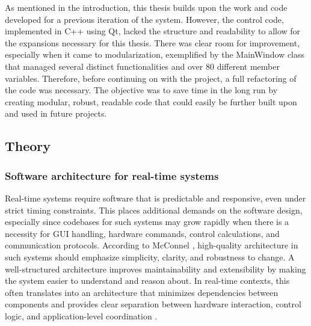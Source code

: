 As mentioned in the introduction, this thesis builds upon the work and code developed for a previous iteration of the system. However, the control code, implemented in C++ using Qt, lacked the structure and readability to allow for the expansions necessary for this thesis. There was clear room for improvement, especially when it came to modularization, exemplified by the MainWindow class that managed several distinct functionalities and over 80 different member variables. Therefore, before continuing on with the project, a full refactoring of the code was necessary. The objective was to save time in the long run by creating modular, robust, readable code that could easily be further built upon and used in future projects.

\subsection{Theory}
\subsubsection{Software architecture for real-time systems}
Real-time systems require software that is predictable and responsive, even under strict timing constraints. This places additional demands on the software design, especially since codebases for such systems may grow rapidly when there is a necessity for GUI handling, hardware commands, control calculations, and communication protocols. According to McConnel \cite{steve_mcconnell_code_nodate}, high-quality architecture in such systems should emphasize simplicity, clarity, and robustness to change. 
\newline \newline
A well-structured architecture improves maintainability and extensibility by making the system easier to understand and reason about. In real-time contexts, this often translates into an architecture that minimizes dependencies between components and provides clear separation between hardware interaction, control logic, and application-level coordination \cite{tanenbaum_distributed_2007}.

